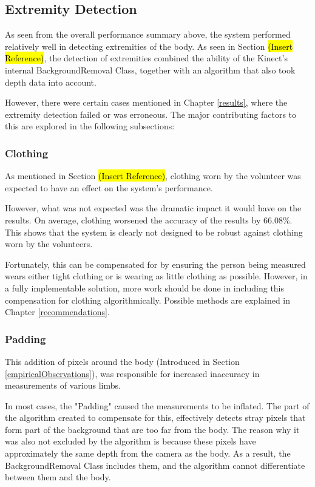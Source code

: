 \subsection{Extremity Detection}
As seen from the overall performance summary above, the system performed relatively well in detecting extremities of the body. As seen in Section \hl{(Insert Reference)}, the detection of extremities combined the ability of the Kinect's internal BackgroundRemoval Class, together with an algorithm that also took depth data into account.  

However, there were certain cases mentioned in Chapter \ref{results}, where the extremity detection failed or was erroneous. The major contributing factors to this are explored in the following subsections:

\subsubsection{Clothing}
As mentioned in Section \hl{(Insert Reference)}, clothing worn by the volunteer was expected to have an effect on the system's performance. 

However, what was not expected was the dramatic impact it would have on the results. On average, clothing worsened the accuracy of the results by 66.08\%. This shows that the system is clearly not designed to be robust against clothing worn by the volunteers.

Fortunately, this can be compensated for by ensuring the person being measured wears either tight clothing or is wearing as little clothing as possible. However, in a fully implementable solution, more work should be done in including this compensation for clothing algorithmically. Possible methods are explained in Chapter \ref{recommendations}. 

\subsubsection{Padding}
This addition of pixels around the body (Introduced in Section \ref{empiricalObservations}), was responsible for increased inaccuracy in measurements of various limbs. 

In most cases, the "Padding" caused the measurements to be inflated. The part of the algorithm created to compensate for this, effectively detects stray pixels that form part of the background that are too far from the body. The reason why it was also not excluded by the algorithm is because these pixels have approximately the same depth from the camera as the body. As a result, the BackgroundRemoval Class includes them, and the algorithm cannot differentiate between them and the body. 

